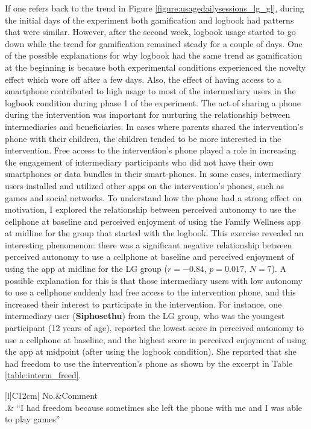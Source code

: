 If one refers back to the trend in Figure \ref{figure:usagedailysessions_lg_gl}, during the initial days of the experiment both gamification and logbook had patterns that were similar. However, after the second week, logbook usage started to go down while the trend for gamification remained steady for a couple of days. One of the possible explanations for why logbook had the same trend as gamification at the beginning is because both experimental conditions experienced the novelty effect which wore off after a few days. Also, the effect of having access to a smartphone contributed to high usage to most of the intermediary users in the logbook condition during phase 1 of the experiment. The act of sharing a phone during the intervention was important for nurturing the relationship between intermediaries and beneficiaries. In cases where parents shared the intervention's phone with their children, the children tended to be more interested in the intervention. Free access to the intervention's phone played a role in increasing the engagement of intermediary participants who did not have their own smartphones or data bundles in their smart-phones. In some cases, intermediary users installed and utilized other apps on the intervention's phones, such as games and social networks. To understand how the phone had a strong effect on motivation, I explored the relationship between perceived autonomy to use the cellphone at baseline and perceived enjoyment of using the Family Wellness app at midline for the group that started with the logbook. This exercise revealed an interesting phenomenon: there was a significant negative relationship between perceived autonomy to use a cellphone at baseline and perceived enjoyment of using the app at midline for the LG group ($r=-0.84$, $p=0.017$, $N=7$). A possible explanation for this is that those intermediary users with low autonomy to use a cellphone suddenly had free access to the intervention phone, and this increased their interest to participate in the intervention. For instance, one intermediary user (\textbf{Siphosethu}) from the LG group, who was the youngest participant (12 years of age), reported the lowest score in perceived autonomy to use a cellphone at baseline, and the highest score in  perceived enjoyment of using the app at midpoint (after using the logbook condition). She reported that she had freedom to use the intervention's phone as shown by the excerpt in Table \ref{table:interm_freed}.

\begin{table}[h!]
\renewcommand{\baselinestretch}{1.5}
  \begin{center}
    \caption{Excerpt: an example of a participant with freedom to use the intervention's phone.}
    \label{table:interm_freed}
	\begin{tabular}{|l|C{12cm}|}
		\hline
		No.&Comment\\
		.& {``I had freedom because sometimes she left the phone with me and I was able to play games''}~\citep{katule2016family}\\
		\hline
	\end{tabular}
  \end{center}
\end{table}


